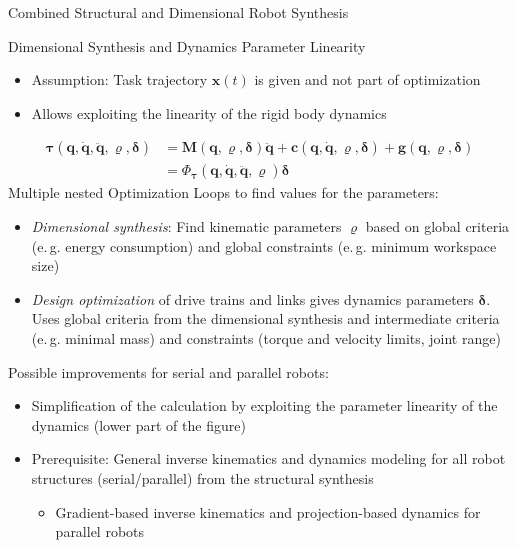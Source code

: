 \documentclass[c]{beamer}
\begin{document}
\begin{frame}
\begin{block}{Combined Structural and Dimensional Robot Synthesis}
{\begin{multicols}{2}
\end{multicols}}
\end{block}
\begin{whiteblock}{Dimensional Synthesis and Dynamics Parameter Linearity}
\parbox{\linewidth}{
\begin{multicols}{2}
\begin{itemize}
    \item Assumption: Task trajectory $\bm{x}(t)$ is given and not part of optimization
    \item Allows exploiting the linearity of the rigid body dynamics
\end{itemize}
\begin{align}
\bm{\tau}(\bm{q},\dot{\bm{q}},\ddot{\bm{q}},\bm{\varrho},\bm{\delta})
&= 
\bm{M}(\bm{q},\bm{\varrho},\bm{\delta}) \ddot{\bm{q}}
+ \bm{c}(\bm{q},\dot{\bm{q}},\bm{\varrho},\bm{\delta})
+ \bm{g}(\bm{q},\bm{\varrho},\bm{\delta}) \nonumber \\
&=
\bm{\varPhi}_{\bm{\tau}}(\bm{q},\dot{\bm{q}},\ddot{\bm{q}},\bm{\varrho}) \bm{\delta} \nonumber
\end{align}
Multiple nested Optimization Loops to find values for the parameters:
\begin{itemize}
    \item \emph{Dimensional synthesis}: Find kinematic parameters $\bm{\varrho}$ based on global criteria (e.\,g. energy consumption) and global constraints (e.\,g. minimum workspace size)
    \item \emph{Design optimization} of drive trains and links gives dynamics parameters $\bm{\delta}$. Uses global criteria from the dimensional synthesis and intermediate criteria (e.\,g. minimal mass) and constraints (torque and velocity limits, joint range)
\end{itemize}
Possible improvements for serial and parallel robots:
\begin{itemize}
    \item Simplification of the calculation by exploiting the parameter linearity of the dynamics (lower part of the figure)
    \item Prerequisite: General inverse kinematics and dynamics modeling for all robot structures (serial/parallel) from the structural synthesis
    \begin{itemize}
        \item Gradient-based inverse kinematics and projection-based dynamics for parallel robots

\end{itemize}
\end{itemize}
\end{multicols}}
\end{whiteblock}
\end{frame}
\end{document}
